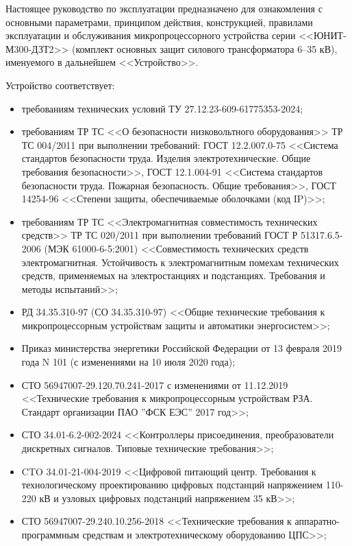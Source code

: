 \documentclass[a4paper, 12pt,table, hidelinks, DIV=calc]{extarticle} %
\begin{document}
\par
Настоящее руководство по эксплуатации предназначено для ознакомления с основными параметрами, принципом действия, конструкцией, правилами эксплуатации и обслуживания микропроцессорного устройства серии <<ЮНИТ-М300-ДЗТ2>> (комплект основных защит силового трансформатора 6–35 кВ), именуемого в дальнейшем <<Устройство>>.

\par
Устройство соответствует:
\begin{itemize}
\item требованиям технических условий ТУ 27.12.23-609-61775353-2024;
\item требованиям ТР ТС <<О безопасности низковольтного оборудования>> ТР ТС 004/2011 при выполнении требований: ГОСТ 12.2.007.0-75 <<Система стандартов безопасности труда. Изделия электротехнические. Общие требования безопасности>>, ГОСТ 12.1.004-91 <<Система стандартов безопасности труда. Пожарная безопасность. Общие требования>>, ГОСТ 14254-96 <<Степени защиты, обеспечиваемые оболочками (код IP)>>; 
\item требованиям ТР ТС <<Электромагнитная совместимость технических средств>> ТР ТС 020/2011 при выполнении требований ГОСТ Р 51317.6.5-2006 (МЭК 61000-6-5:2001) <<Совместимость технических средств электромагнитная. Устойчивость к электромагнитным помехам технических средств, применяемых на электростанциях и подстанциях. Требования и методы испытаний>>;
\item РД 34.35.310-97 (СО 34.35.310-97) <<Общие технические требования к микропроцессорным устройствам защиты и автоматики энергосистем>>;
\item Приказ министерства энергетики Российской Федерации от 13 февраля 2019 года N 101 (с изменениями на 10 июля 2020 года);
\item СТО 56947007-29.120.70.241-2017 с изменениями от 11.12.2019 <<Технические требования к микропроцессорным устройствам РЗА. Стандарт организации ПАО ''ФСК ЕЭС'' 2017 год>>;
\item СТО 34.01-6.2-002-2024 <<Контроллеры присоединения, преобразователи дискретных сигналов. Типовые технические требования>>;
\item CTO 34.01-21-004-2019 <<Цифровой питающий центр. Требования к технологическому проектированию цифровых подстанций напряжением 110-220 кВ и узловых цифровых подстанций напряжением 35 кВ>>;
\item СТО 56947007-29.240.10.256-2018 <<Технические требования к аппаратно-программным средствам и электротехническому оборудованию ЦПС>>;

\end{itemize}
\end{document}
